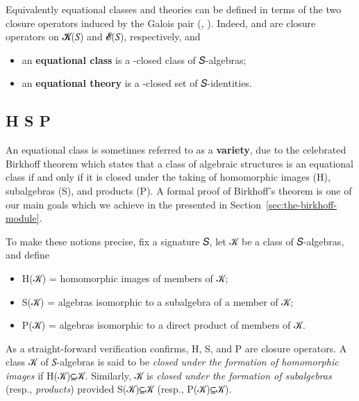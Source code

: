 \documentclass[a4paper,USenglish,cleveref,autoref,thm-restate]{lipics-v2019}
\begin{document}
Equivalently equational classes and theories can be defined in terms of the two closure operators induced by the Galois pair (, ). Indeed,   and   are closure operators on \AB 𝓚(\AB 𝑆) and \AB 𝓔(\AB 𝑆), respectively, and
\begin{itemize}
\item an \textbf{equational class} is a  -closed class of \AB 𝑆-algebras;
\item an \textbf{equational theory} is a  -closed set of \AB 𝑆-identities.
\end{itemize}


\subsection{H S P}\label{sec:closure-operators}
An equational class is sometimes referred to as a \textbf{variety}, due to the celebrated Birkhoff theorem which states that a class of algebraic structures is an equational class if and only if it is closed under the taking of homomorphic images (\AF H), subalgebras (\AF S), and products (\AF P). A formal \agda proof of Birkhoff's theorem is one of our main goals which we achieve in the \birkhoffmodule presented in Section~\ref{sec:the-birkhoff-module}.

To make these notions precise, fix a signature \AB 𝑆, let \AB 𝒦 be a class of \AB 𝑆-algebras, and define
\begin{itemize}
\item \AF H(\AB 𝒦) = homomorphic images of members of \AB 𝒦;
\item \AF S(\AB 𝒦) = algebras isomorphic to a subalgebra of a member of \AB 𝒦;
\item \AF P(\AB 𝒦) = algebras isomorphic to a direct product of members of \AB 𝒦.
\end{itemize}
As a straight-forward verification confirms, \AF H, \AF S, and \AF P are closure operators. A class \AB 𝒦 of \AB 𝑆-algebras is said to be \emph{closed under the formation of homomorphic images} if \AF H(\AB 𝒦)\AS\ASy ⊆\AS\AB 𝒦. Similarly, \AB 𝒦 is \emph{closed under the formation of subalgebras} (resp., \emph{products}) provided \AF S(\AB 𝒦)\AS\ASy ⊆\AS\AB 𝒦 (resp., \AF P(\AB 𝒦)\AS\ASy ⊆\AS\AB 𝒦).

\end{document}
